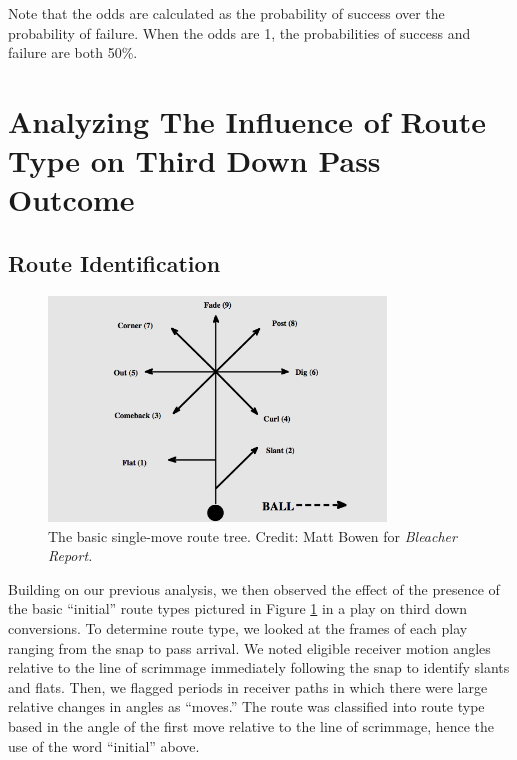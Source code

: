 \documentclass[12pt,letterpaper]{article}
\begin{document}
Note that the odds are calculated as the probability of success over the probability of failure. When the odds are 1, the probabilities of success and failure are both 50\%.

\section*{Analyzing The Influence of Route Type on Third Down Pass Outcome}

\subsection*{Route Identification}

\begin{figure}[h!]
\centering
\includegraphics[width=0.8\textwidth]{routeTree.png}
\caption{The basic single-move route tree. Credit: Matt Bowen for \textit{Bleacher Report.}}
\label{fig:routeTree}
\end{figure}

Building on our previous analysis, we then observed the effect of the presence of the basic ``initial'' route types pictured in Figure \ref{fig:routeTree} in a play on third down conversions. To determine route type, we looked at the frames of each play ranging from the snap to pass arrival. We noted eligible receiver motion angles relative to the line of scrimmage immediately following the snap to identify slants and flats. Then, we flagged periods in receiver paths in which there were large relative changes in angles as ``moves.'' The route was classified into route type based in the angle of the first move relative to the line of scrimmage, hence the use of the word ``initial'' above.
\end{document}
